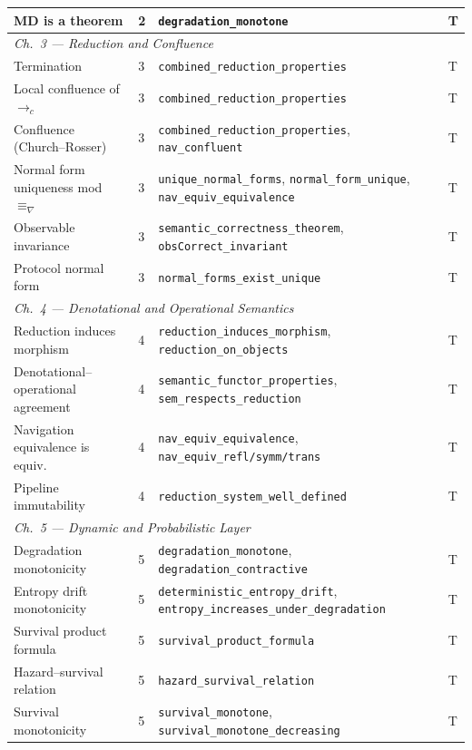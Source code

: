 \begin{center}
\begin{tabular}{p{4.5cm}lp{4.8cm}l}
MD is a theorem
  & 2 & \texttt{degradation\_monotone}              & T \\
\midrule
\multicolumn{4}{l}{\textit{Ch.~3 — Reduction and Confluence}} \\[2pt]
Termination
  & 3 & \texttt{combined\_reduction\_properties}    & T \\
Local confluence of $\to_c$
  & 3 & \texttt{combined\_reduction\_properties}    & T \\
Confluence (Church--Rosser)
  & 3 & \texttt{combined\_reduction\_properties}, \texttt{nav\_confluent} & T \\
Normal form uniqueness mod $\equiv_\nabla$
  & 3 & \texttt{unique\_normal\_forms}, \texttt{normal\_form\_unique}, \texttt{nav\_equiv\_equivalence} & T \\
Observable invariance
  & 3 & \texttt{semantic\_correctness\_theorem}, \texttt{obsCorrect\_invariant} & T \\
Protocol normal form
  & 3 & \texttt{normal\_forms\_exist\_unique}       & T \\
\midrule
\multicolumn{4}{l}{\textit{Ch.~4 — Denotational and Operational Semantics}} \\[2pt]
Reduction induces morphism
  & 4 & \texttt{reduction\_induces\_morphism}, \texttt{reduction\_on\_objects} & T \\
Denotational--operational agreement
  & 4 & \texttt{semantic\_functor\_properties}, \texttt{sem\_respects\_reduction} & T \\
Navigation equivalence is equiv.
  & 4 & \texttt{nav\_equiv\_equivalence}, \texttt{nav\_equiv\_refl/symm/trans} & T \\
Pipeline immutability
  & 4 & \texttt{reduction\_system\_well\_defined}   & T \\
\midrule
\multicolumn{4}{l}{\textit{Ch.~5 — Dynamic and Probabilistic Layer}} \\[2pt]
Degradation monotonicity
  & 5 & \texttt{degradation\_monotone}, \texttt{degradation\_contractive} & T \\
Entropy drift monotonicity
  & 5 & \texttt{deterministic\_entropy\_drift}, \texttt{entropy\_increases\_under\_degradation} & T \\
Survival product formula
  & 5 & \texttt{survival\_product\_formula}         & T \\
Hazard--survival relation
  & 5 & \texttt{hazard\_survival\_relation}         & T \\
Survival monotonicity
  & 5 & \texttt{survival\_monotone}, \texttt{survival\_monotone\_decreasing} & T \\

\end{tabular}
\end{center}
